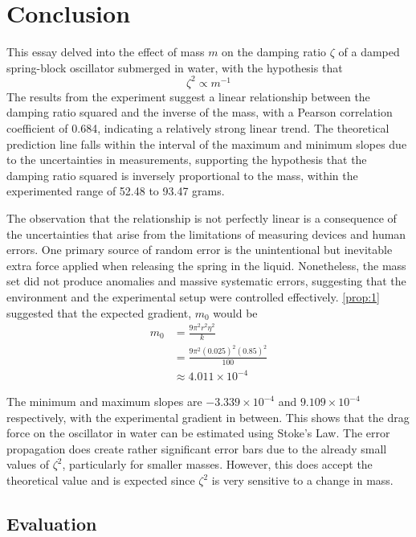 \documentclass[a4paper,12pt]{article}
\begin{document}
\section{Conclusion}

This essay delved into the effect of mass $m$ on the damping ratio $\zeta$ of a damped spring-block oscillator submerged in water, with the hypothesis that $$\zeta^2 \propto m^{-1}$$ The results from the experiment suggest a linear relationship between the damping ratio squared and the inverse of the mass, with a Pearson correlation coefficient of 0.684, indicating a relatively strong linear trend. The theoretical prediction line falls within the interval of the maximum and minimum slopes due to the uncertainties in measurements, supporting the hypothesis that the damping ratio squared is inversely proportional to the mass, within the experimented range of 52.48 to 93.47 grams.


The observation that the relationship is not perfectly linear is a consequence of the uncertainties that arise from the limitations of measuring devices and human errors. One primary source of random error is the unintentional but inevitable extra force applied when releasing the spring in the liquid. Nonetheless, the mass set did not produce anomalies and massive systematic errors, suggesting that the environment and the experimental setup were controlled effectively. \cref{prop:1} suggested that the expected gradient, $m_0$ would be \begin{align*}
  m_0 & =    \frac{9\pi^2r^2\eta^2}{k}               \\
      & =        \frac{9\pi^2(0.025)^2(0.85)^2}{100} \\
      & \approx  4.011 \times 10^{-4}
\end{align*}

The minimum and maximum slopes are $-3.339\times 10^{-4}$ and $9.109\times 10^{-4}$ respectively, with the experimental gradient in between. This shows that the drag force on the oscillator in water can be estimated using Stoke's Law. The error propagation does create rather significant error bars due to the already small values of $\zeta^2$, particularly for smaller masses. However, this does accept the theoretical value and is expected since $\zeta^2$ is very sensitive to a change in mass.

\subsection{Evaluation}
\end{document}
